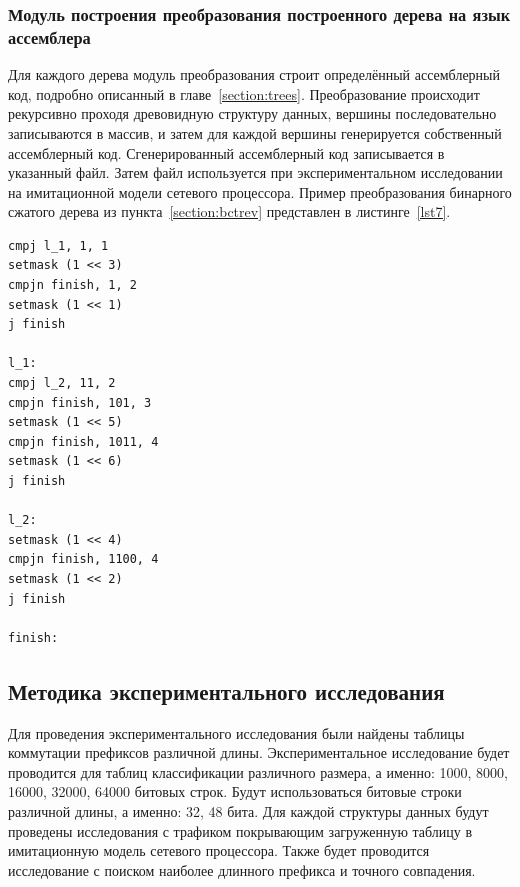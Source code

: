 \documentclass[conference]{IEEEtran}
\begin{document}
        \subsubsection{Модуль построения преобразования построенного дерева на язык ассемблера}
            Для каждого дерева модуль преобразования строит определённый ассемблерный код, подробно описанный в главе~\ref{section:trees}.
            Преобразование происходит рекурсивно проходя древовидную структуру данных, вершины последовательно записываются в массив, и затем
            для каждой вершины генерируется собственный ассемблерный код.
            Сгенерированный ассемблерный код записывается в указанный файл. Затем файл используется при экспериментальном исследовании на имитационной модели сетевого процессора.
            Пример преобразования бинарного сжатого дерева из пункта~\ref{section:bctrev} представлен в листинге~\ref{lst7}.\\
\begin{lstlisting}[caption=Пример бинарного сжатого дерева на языке ассемблера., label=lst7]
cmpj l_1, 1, 1
setmask (1 << 3)
cmpjn finish, 1, 2
setmask (1 << 1)
j finish

l_1:
cmpj l_2, 11, 2
cmpjn finish, 101, 3
setmask (1 << 5)
cmpjn finish, 1011, 4
setmask (1 << 6)
j finish

l_2:
setmask (1 << 4)
cmpjn finish, 1100, 4
setmask (1 << 2)
j finish

finish:
\end{lstlisting}

    \subsection{Методика экспериментального исследования}
            Для проведения экспериментального исследования были найдены таблицы коммутации префиксов различной длины. Экспериментальное исследование будет проводится
            для таблиц классификации различного размера, а именно: 1000, 8000, 16000, 32000, 64000 битовых строк. Будут использоваться битовые строки различной длины, а именно:
            32, 48 бита. Для каждой структуры данных будут проведены исследования с трафиком покрывающим загруженную таблицу в имитационную модель сетевого процессора.
            Также будет проводится исследование с поиском наиболее длинного префикса и точного совпадения.
            
\end{document}

